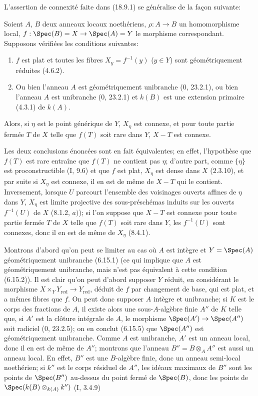 L'assertion de connexité faite dans (18.9.1) se généralise de la façon suivante:

\begin{theorem}[18.9.7]
\label{IV.18.9.7}
Soient $A$, $B$ deux anneaux locaux noethériens, $\rho:A\to B$ un homomorphisme local, $f:\Spec(B)=X\to\Spec(A)=Y$ le morphisme correspondant. Supposons vérifiées les conditions suivantes:
\begin{enumerate}
  \item[(i)] $f$ est plat et toutes les fibres $X_y=f^{-1}(y)$ ($y\in Y$) sont géométriquement réduites (4.6.2).
  \item[(ii)] Ou bien l'anneau $A$ est géométriquement unibranche (0, 23.2.1), ou bien l'anneau $A$ est unibranche (0, 23.2.1) et $k(B)$ est une extension primaire (4.3.1) de $k(A)$.
\end{enumerate}
Alors, si $\eta$ est le point générique de $Y$, $X_\eta$ est connexe, et pour toute partie fermée $T$ de $X$ telle que $f(T)$ soit rare dans $Y$, $X-T$ est connexe.
\end{theorem}

Les deux conclusions énoncées sont en fait équivalentes; en effet, l'hypothèse que $f(T)$ est rare entraîne que $f(T)$ ne contient pas $\eta$; d'autre part, comme $\{\eta\}$ est proconstructible (I, 9.6) et que $f$ est plat, $X_\eta$ est dense dans $X$ (2.3.10), et par suite si $X_\eta$ est connexe, il en est de même de $X-T$ qui le contient. Inversement, lorsque $U$ parcourt l'ensemble des voisinages ouverts affines de $\eta$ dans $Y$, $X_\eta$ est limite projective des sous-préschémas induits sur les ouverts $f^{-1}(U)$ de $X$ (8.1.2, $a)$); si l'on suppose que $X-T$ est connexe pour toute partie fermée $T$ de $X$ telle que $f(T)$ soit rare dans $Y$, les $f^{-1}(U)$ sont connexes, donc il en est de même de $X_\eta$ (8.4.1).

Montrons d'abord qu'on peut se limiter au cas où $A$ est intègre et $Y=\Spec(A)$ géométriquement unibranche (6.15.1) (ce qui implique que $A$ est géométriquement unibranche, mais n'est pas équivalent à cette condition (6.15.2)). Il est clair qu'on peut d'abord supposer $Y$ réduit, en considérant le morphisme $X\times_Y Y_{\mathrm{red}}\to Y_{\mathrm{red}}$, déduit de $f$ par changement de base, qui est plat, et a mêmes fibres que $f$. On peut donc supposer $A$ intègre et unibranche; si $K$ est le corps des fractions de $A$, il existe alors une sous-$A$-algèbre finie $A''$ de $K$ telle que, si $A'$ est la clôture intégrale de $A$, le morphisme $\Spec(A')\to\Spec(A'')$ soit radiciel (0, 23.2.5); on en conclut (6.15.5) que $\Spec(A'')$ est géométriquement unibranche. Comme $A$ est unibranche, $A'$ est un anneau local, donc il en est de même de $A''$; montrons que l'anneau $B''=B\otimes_A A''$ est aussi un anneau local. En effet, $B''$ est une $B$-algèbre finie, donc un anneau semi-local noethérien; si $k''$ est le corps résiduel de $A''$, les idéaux maximaux de $B''$ sont les points de $\Spec(B'')$ au-dessus du point fermé de $\Spec(B)$, donc les points de $\Spec(k(B)\otimes_{k(A)}k'')$ (I, 3.4.9)

